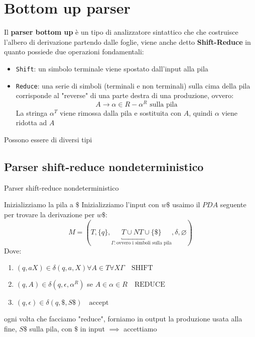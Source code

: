 \chapter{Bottom up parser}

Il \textbf{parser bottom up} è un tipo di analizzatore sintattico che che costruisce l'albero di derivazione partendo dalle foglie, viene anche detto \textbf{Shift-Reduce} in quanto possiede due operazioni fondamentali:
\begin{itemize}
    \item \texttt{Shift}: un simbolo terminale viene spostato dall'input alla pila 
    \item \texttt{Reduce}: una serie di simboli (terminali e non terminali) sulla cima della pila corrisponde al "reverse" di una parte destra di una produzione, ovvero:
    \[
        A\to\alpha \in R - \alpha^R \text{ sulla pila}
    \]
    La stringa $\alpha^T$ viene rimossa dalla pila e sostituita con $A$, quindi $\alpha$ viene ridotta ad $A$
\end{itemize}

Possono essere di diversi tipi

\section{Parser shift-reduce nondeterministico}
\begin{algorithm}
    \caption{Parser shift-reduce nondeterministico}

    Inizializziamo la pila a $\$$\;
    Inizializziamo l'input con $w\$$\;
    usaimo il $PDA$ seguente per trovare la derivazione per $w\$$:
    \[
        M=(T, \{q\},\underbracket{T\cup NT \cup \{\$\}}_{\Gamma: \text{ovvero i simboli sulla pila}}, \delta, \varnothing)
    \]
    Dove:
    \begin{enumerate}
        \item $(q,aX)\in \delta (q,a,X)\forall A\in T\forall X\Gamma\quad \text{SHIFT}$
        \item $(q,A)\in\delta(q,\epsilon, \alpha^R)$ se $A\in \alpha\in R\quad \text{REDUCE}$
        \item $(q,\epsilon)\in \delta(q,\$,S\$)\quad \text{accept}$
    \end{enumerate}\;
    ogni volta che facciamo "reduce", forniamo in output la produzione usata\;
    alla fine, $S\$$ sulla pila, con $\$$ in input $\implies$ accettiamo\;
\end{algorithm}

